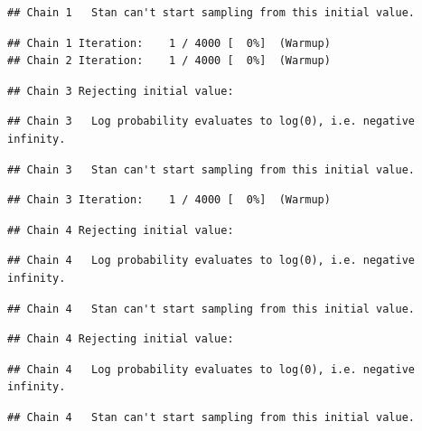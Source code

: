 \documentclass[
]{article}
\begin{document}
\begin{verbatim}
## Chain 1   Stan can't start sampling from this initial value.
\end{verbatim}

\begin{verbatim}
## Chain 1 Iteration:    1 / 4000 [  0%]  (Warmup) 
## Chain 2 Iteration:    1 / 4000 [  0%]  (Warmup)
\end{verbatim}

\begin{verbatim}
## Chain 3 Rejecting initial value:
\end{verbatim}

\begin{verbatim}
## Chain 3   Log probability evaluates to log(0), i.e. negative infinity.
\end{verbatim}

\begin{verbatim}
## Chain 3   Stan can't start sampling from this initial value.
\end{verbatim}

\begin{verbatim}
## Chain 3 Iteration:    1 / 4000 [  0%]  (Warmup)
\end{verbatim}

\begin{verbatim}
## Chain 4 Rejecting initial value:
\end{verbatim}

\begin{verbatim}
## Chain 4   Log probability evaluates to log(0), i.e. negative infinity.
\end{verbatim}

\begin{verbatim}
## Chain 4   Stan can't start sampling from this initial value.
\end{verbatim}

\begin{verbatim}
## Chain 4 Rejecting initial value:
\end{verbatim}

\begin{verbatim}
## Chain 4   Log probability evaluates to log(0), i.e. negative infinity.
\end{verbatim}

\begin{verbatim}
## Chain 4   Stan can't start sampling from this initial value.
\end{verbatim}
\end{document}
